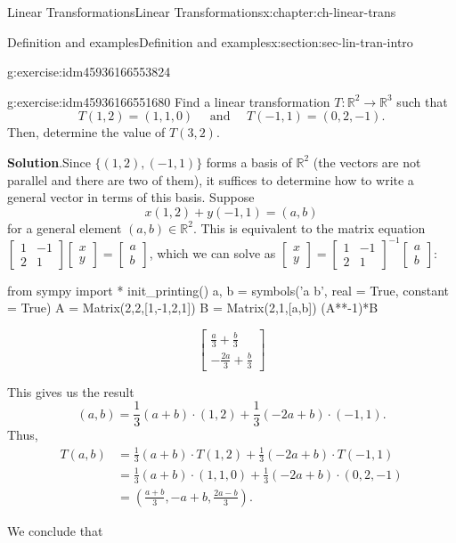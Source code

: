 \documentclass[oneside,10pt,]{book}
\newcommand{\blocktitlefont}{\relax}
\numberwithin{equation}{section}
\newcommand{\bbm}{\begin{bmatrix}}
\newcommand{\ebm}{\end{bmatrix}}
\newcommand{\R}{\mathbb{R}}
\newcommand{\amp}{&}
\begin{document}
\begin{chapterptx}{Linear Transformations}{}{Linear Transformations}{}{}{x:chapter:ch-linear-trans}
\begin{sectionptx}{Definition and examples}{}{Definition and examples}{}{}{x:section:sec-lin-tran-intro}
\begin{inlineexercise}{}{g:exercise:idm45936166553824}
%
\end{inlineexercise}%
\begin{inlineexercise}{}{g:exercise:idm45936166551680}%
Find a linear transformation \(T:\R^2\to \R^3\) such that%
\begin{equation*}
T(1,2)=(1,1,0) \quad \text{ and } \quad T(-1,1) = (0,2,-1)\text{.}
\end{equation*}
Then, determine the value of \(T(3,2)\).%
\par\smallskip%
\noindent\textbf{\blocktitlefont Solution}.\label{g:solution:idm45936166543952}{}\hypertarget{g:solution:idm45936166543952}{}\quad{}Since \(\{(1,2),(-1,1)\}\) forms a basis of \(\R^2\) (the vectors are not parallel and there are two of them), it suffices to determine how to write a general vector in terms of this basis. Suppose%
\begin{equation*}
x(1,2)+y(-1,1)=(a,b)
\end{equation*}
for a general element \((a,b)\in \R^2\). This is equivalent to the matrix equation \(\bbm 1\amp -1\\2\amp 1\ebm\bbm x\\y\ebm = \bbm a\\b\ebm\), which we can solve as \(\bbm x\\y\ebm = \bbm 1\amp -1\\2\amp 1\ebm^{-1}\bbm a\\b\ebm\):%
\begin{sageinput}
from sympy import *
init_printing()
a, b = symbols('a b', real = True, constant = True)
A = Matrix(2,2,[1,-1,2,1])
B = Matrix(2,1,[a,b])
(A**-1)*B
\end{sageinput}
\begin{sageoutput}
\[\bbm \frac{a}{3}+\frac{b}{3}\\-\frac{2a}{3}+\frac{b}{3}\ebm\]
\end{sageoutput}
This gives us the result%
\begin{equation*}
(a,b) = \frac13(a+b)\cdot (1,2)+\frac13(-2a+b)\cdot (-1,1).
\end{equation*}
Thus,%
\begin{align*}
T(a,b) \amp = \frac13(a+b)\cdot T(1,2)+\frac13(-2a+b)\cdot T(-1,1) \\
\amp = \frac13(a+b)\cdot (1,1,0)+\frac13(-2a+b)\cdot (0,2,-1)\\
\amp = \left(\frac{a+b}{3}, -a+b, \frac{2a-b}{3}\right)\text{.}
\end{align*}
%
\par
We conclude that%
\begin{equation*}

\end{equation*}
\end{inlineexercise}
\end{sectionptx}
\end{chapterptx}
\end{document}
